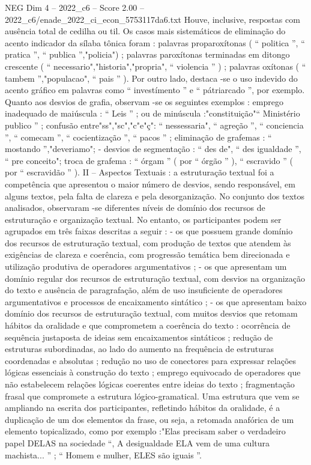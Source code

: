 \begin{textsample}{NEG Dim 4 – 2022\_c6 – Score 2.00 – 2022\_c6/enade\_2022\_ci\_econ\_5753117da6.txt}
Houve, inclusive, respostas com ausência total de cedilha ou til.
Os casos mais sistemáticos de eliminação do acento indicador da sílaba tônica foram : palavras proparoxítonas ( “ politica ”, “ pratica ”, “ publica ”,"policia") ; palavras paroxítonas terminadas em ditongo crescente ( “ necessario","historia","propria", “ violencia ” ) ; palavras oxítonas ( “ tambem ”,"populacao", “ pais ” ).
Por outro lado, destaca -se o uso indevido do acento gráfico em palavras como “ investímento ” e “ pátriarcado ”, por exemplo.
Quanto aos desvios de grafia, observam -se os seguintes exemplos : emprego inadequado de maiúscula : “ Leis ” ; ou de minúscula :"constituição"“ Ministério publico ” ; confusão entre"ss","sc","c"e"ç": “ nessessaria", “ agreção ”, “ conciencia ”, “ comecam ”, “ cocientização ”, “ pacos ” ; eliminação de grafemas : “ mostando ”,"deveriamo"; - desvios de segmentação : “ des de", “ des igualdade ”, “ pre conceito"; troca de grafema : “ órgam ” ( por “ órgão ” ), “ escravido ” ( por “ escravidão ” ).
II – Aspectos Textuais : a estruturação textual foi a competência que apresentou o maior número de desvios, sendo responsável, em alguns textos, pela falta de clareza e pela desorganização.
No conjunto dos textos analisados, observaram -se diferentes níveis de domínio dos recursos de estruturação e organização textual.
No entanto, os participantes podem ser agrupados em três faixas descritas a seguir : - os que possuem grande domínio dos recursos de estruturação textual, com produção de textos que atendem às exigências de clareza e coerência, com progressão temática bem direcionada e utilização produtiva de operadores argumentativos ; - os que apresentam um domínio regular dos recursos de estruturação textual, com desvios na organização do texto e ausência de paragrafação, além de uso insuficiente de operadores argumentativos e processos de encaixamento sintático ; - os que apresentam baixo domínio dos recursos de estruturação textual, com muitos desvios que retomam hábitos da oralidade e que comprometem a coerência do texto : ocorrência de sequência justaposta de ideias sem encaixamentos sintáticos ; redução de estruturas subordinadas, ao lado do aumento na frequência de estruturas coordenadas e absolutas ; redução no uso de conectores para expressar relações lógicas essenciais à construção do texto ; emprego equivocado de operadores que não estabelecem relações lógicas coerentes entre ideias do texto ; fragmentação frasal que compromete a estrutura lógico-gramatical.
Uma estrutura que vem se ampliando na escrita dos participantes, refletindo hábitos da oralidade, é a duplicação de um dos elementos da frase, ou seja, a retomada anafórica de um elemento topicalizado, como por exemplo :"Elas precisam saber o verdadeiro papel DELAS na sociedade “, A desigualdade ELA vem de uma cultura machista... ” ; “ Homem e mulher, ELES são iguais ”.

\end{textsample}
